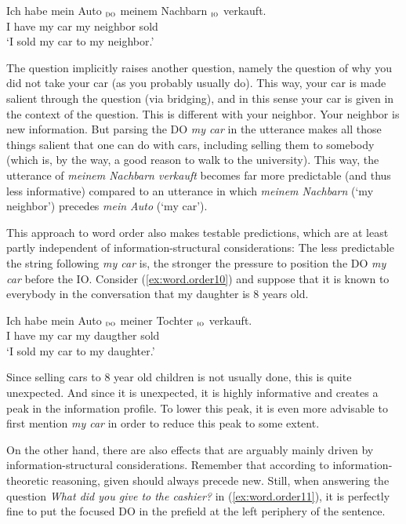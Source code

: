 \documentclass[output=paper,colorlinks,citecolor=brown]{langscibook}
\begin{document}
\ea \label{ex:word.order9}
    \gll Ich habe {\ob} mein Auto {\cb}$_{\textsc{do}}$ {\ob} meinem Nachbarn {\cb}$_{\textsc{io}}$ verkauft.\\
    I have {} my car {} {} my neighbor {} sold\\
    \glt `I sold my car to my neighbor.' %
\z
          
The question implicitly raises another question, namely the question of why you did not take your car (as you probably usually do). This way, your car is made salient through the question (via bridging), and in this sense your car is given in the context of the question. This is different with your neighbor. Your neighbor is new information. But parsing the DO \textit{my car} in the utterance makes all those things salient that one can do with cars, including selling them to somebody (which is, by the way, a good reason to walk to the university). This way, the utterance of \textit{meinem Nachbarn verkauft} becomes far more predictable (and thus less informative) compared to an utterance in which \textit{meinem Nachbarn} (`my neighbor') precedes \textit{mein Auto} (`my car').

This approach to word order also makes testable predictions, which are at least partly independent of information-structural considerations: The less predictable the string following \textit{my car} is, the stronger the pressure to position the DO \textit{my car} before the IO. Consider (\ref{ex:word.order10}) and suppose that it is known to everybody in the conversation that my daughter is 8 years old.     

\ea \label{ex:word.order10}
    \gll Ich habe {\ob} mein Auto {\cb}$_{\textsc{do}}$ {\ob} meiner Tochter {\cb}$_{\textsc{io}}$ verkauft.\\
    I have {} my car {} {} my daugther {}  sold\\
    \glt `I sold my car to my daughter.' %
\z
    
Since selling cars to 8 year old children is not usually done, this is quite unexpected. And since it is unexpected, it is highly informative and creates a peak in the information profile. To lower this peak, it is even more advisable to first mention \textit{my car} in order to reduce this peak to some extent. 

On the other hand, there are also effects that are arguably mainly driven by in\-for\-ma\-tion-structural considerations. Remember that according to information-theoretic reasoning, given should always precede new. Still, when answering the question \textit{What did you give to the cashier?} in (\ref{ex:word.order11}), it is perfectly fine to put the focused DO in the prefield at the left periphery of the sentence.
\end{document}
